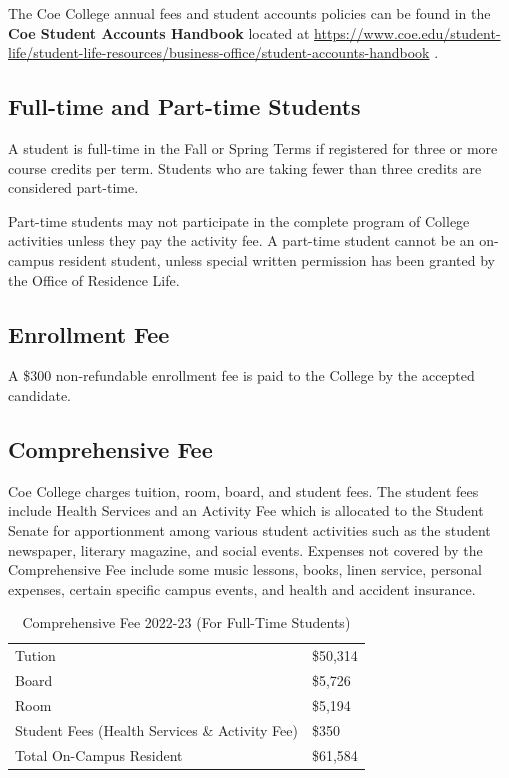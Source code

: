 \documentclass[
  letterpaper,
]{scrbook}
\renewcommand\toprule[2]\relax
\renewcommand\bottomrule[2]\relax
\begin{document}
The Coe College annual fees and student accounts policies can be found
in the \textbf{Coe Student Accounts Handbook} located at
\url{https://www.coe.edu/student-life/student-life-resources/business-office/student-accounts-handbook}
.

\hypertarget{full-time-and-part-time-students}{%
\subsection{Full-time and Part-time
Students}\label{full-time-and-part-time-students}}

A student is full-time in the Fall or Spring Terms if registered for
three or more course credits per term. Students who are taking fewer
than three credits are considered part-time.

Part-time students may not participate in the complete program of
College activities unless they pay the activity fee. A part-time student
cannot be an on-campus resident student, unless special written
permission has been granted by the Office of Residence Life.

\hypertarget{enrollment-fee}{%
\subsection{Enrollment Fee}\label{enrollment-fee}}

A \$300 non-refundable enrollment fee is paid to the College by the
accepted candidate.

\hypertarget{comprehensive-fee}{%
\subsection{Comprehensive Fee}\label{comprehensive-fee}}

Coe College charges tuition, room, board, and student fees. The student
fees include Health Services and an Activity Fee which is allocated to
the Student Senate for apportionment among various student activities
such as the student newspaper, literary magazine, and social events.
Expenses not covered by the Comprehensive Fee include some music
lessons, books, linen service, personal expenses, certain specific
campus events, and health and accident insurance.

\begin{longtable}[]{@{}
  >{\raggedright\arraybackslash}p{}
  >{\raggedleft\arraybackslash}p{}@{}}
\caption{Comprehensive Fee 2022-23 (For Full-Time
Students)}\tabularnewline
\toprule\noalign{}
\endfirsthead
\endhead
\bottomrule\noalign{}
\endlastfoot
Tution & \$50,314 \\
Board & \$5,726 \\
Room & \$5,194 \\
Student Fees (Health Services \& Activity Fee) & \$350 \\
Total On-Campus Resident & \$61,584 \\
\end{longtable}
\end{document}

